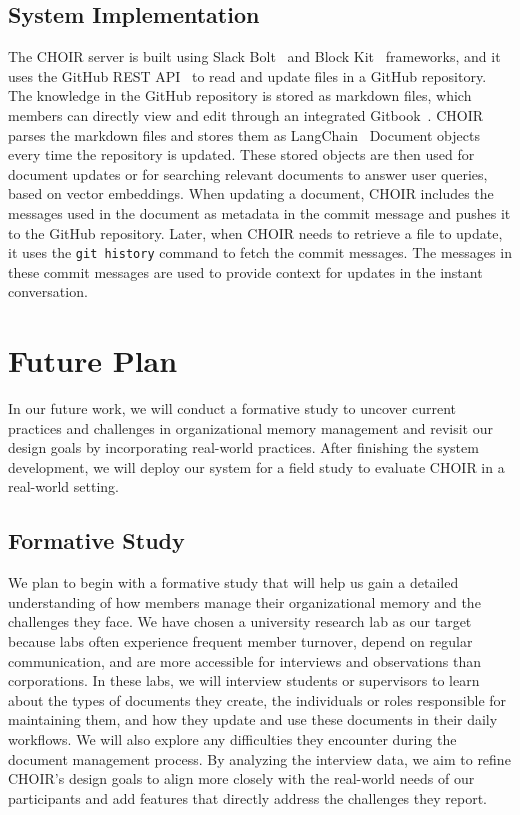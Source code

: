\documentclass[sigconf,screen]{acmart}
\begin{document}
\subsection{System Implementation}
The CHOIR server is built using Slack Bolt~\cite{bolt} and Block Kit~\cite{blockkit} frameworks, and it uses the GitHub REST API~\cite{githubapi} to read and update files in a GitHub repository. The knowledge in the GitHub repository is stored as markdown files, which members can directly view and edit through an integrated Gitbook~\cite{gitbook}. CHOIR parses the markdown files and stores them as LangChain~\cite{langchain} Document objects every time the repository is updated. These stored objects are then used for document updates or for searching relevant documents to answer user queries, based on vector embeddings. When updating a document, CHOIR includes the messages used in the document as metadata in the commit message and pushes it to the GitHub repository. Later, when CHOIR needs to retrieve a file to update, it uses the \texttt{git history} command to fetch the commit messages. The messages in these commit messages are used to provide context for updates in the instant conversation.

\section{Future Plan}

In our future work, we will conduct a formative study to uncover current practices and challenges in organizational memory management and revisit our design goals by incorporating real-world practices. After finishing the system development, we will deploy our system for a field study to evaluate CHOIR in a real-world setting.

\subsection{Formative Study}

We plan to begin with a formative study that will help us gain a detailed understanding of how members manage their organizational memory and the challenges they face. We have chosen a university research lab as our target because labs often experience frequent member turnover, depend on regular communication, and are more accessible for interviews and observations than corporations. In these labs, we will interview students or supervisors to learn about the types of documents they create, the individuals or roles responsible for maintaining them, and how they update and use these documents in their daily workflows. We will also explore any difficulties they encounter during the document management process. By analyzing the interview data, we aim to refine CHOIR's design goals to align more closely with the real-world needs of our participants and add features that directly address the challenges they report.
\end{document}
